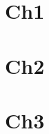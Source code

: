 \documentclass[a4paper]{report}
\begin{document}
\tableofcontents
\chapter{Ch1}
\chapter{Ch2}
\chapter{Ch3}
\end{document}
